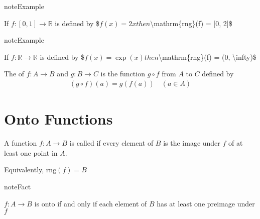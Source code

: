 \documentclass[letterpaper,10pt,english]{jupyterBook}
\begin{document}
\begin{sphinxadmonition}{note}{Example}

\sphinxAtStartPar
If \( f \colon [0, 1] \to \mathbb{R}\) is defined by
\$\(
f(x) = 2x
\)\(
then \)\textbackslash{}mathrm\{rng\}(f) = {[}0, 2{]}\$
\end{sphinxadmonition}

\begin{sphinxadmonition}{note}{Example}

\sphinxAtStartPar
If \(f \colon \mathbb{R} \to \mathbb{R}\) is defined by
\$\(
f(x) = \exp(x) 
\)\(
then \)\textbackslash{}mathrm\{rng\}(f) = (0, \textbackslash{}infty)\$
\end{sphinxadmonition}

\sphinxAtStartPar
The  of \(f \colon A \to B\) and \(g \colon B \to C\) is the
function \(g \circ f\) from \(A\) to \(C\) defined by
\begin{equation*}
\begin{split}
(g \circ f)(a) = g(f(a)) \quad (a \in A)
\end{split}
\end{equation*}
\begin{figure}[htbp]
\centering

\noindent{}
\end{figure}


\section{Onto Functions}
\label{\detokenize{03.set_theory:onto-functions}}
\sphinxAtStartPar
A function \(f \colon A \to B\) is called  if every element of \(B\)
is the image under \(f\) of at least one point in \(A\).

\sphinxAtStartPar
Equivalently, \(\mathrm{rng}(f) = B\)

\begin{figure}[htbp]
\centering

\noindent{}
\end{figure}

\begin{sphinxadmonition}{note}{Fact}

\sphinxAtStartPar
\(f \colon A \to B\) is onto if and only if each element of \(B\)
has at least one preimage under \(f\)
\end{sphinxadmonition}
\end{document}
